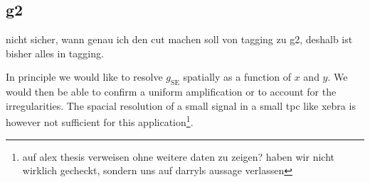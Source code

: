 
\FloatBarrier
\subsection{g2}
\label{ssec:g2}
\FloatBarrier

nicht sicher, wann genau ich den cut machen soll von tagging zu g2, deshalb ist bisher alles in tagging.



In principle we would like to resolve $ g_\mathrm{SE} $ spatially as a function of $ x $ and $ y $.
We would then be able to confirm a uniform amplification or to account for the irregularities.
The spacial resolution of a small signal in a small \gls{tpc} like \gls{xebra} is however not sufficient for this application\footnote{auf alex thesis verweisen ohne weitere daten zu zeigen? haben wir nicht wirklich gecheckt, sondern uns auf darryls aussage verlassen}.
